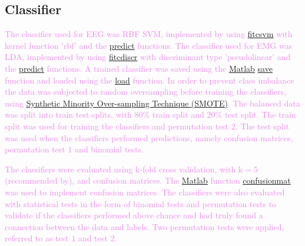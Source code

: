 
\subsection{Classifier}
\textcolor{violet}{The classifier used for EEG was RBF SVM, implemented by using \href{https://se.mathworks.com/help/stats/fitcsvm.html}{fitcsvm} with kernel function 'rbf' and the \href{https://se.mathworks.com/help/stats/linearmodel.predict.html}{predict} functions.}
\textcolor{violet}{The classifier used for EMG was LDA, implemented by using \href{https://se.mathworks.com/help/stats/fitcdiscr.html}{fitcdiscr} with discriminant type 'pseudolinear' and the \href{https://se.mathworks.com/help/stats/linearmodel.predict.html}{predict} functions.}
\textcolor{violet}{A trained classifier was saved using the \href{https://se.mathworks.com/products/matlab.html}{Matlab} \href{https://se.mathworks.com/help/matlab/ref/save.html}{save} function and loaded using the \href{https://se.mathworks.com/help/matlab/ref/load.html}{load} function.}
\textcolor{violet}{In order to prevent class imbalance the data was subjected to random oversampling before training the classifiers, using \href{https://se.mathworks.com/matlabcentral/fileexchange/75401-synthetic-minority-over-sampling-technique-smote}{Synthetic Minority Over-sampling Technique (SMOTE)}.}
\textcolor{violet}{The balanced data was split into train test splits, with $80\%$ train split and $20\%$ test split. The train split was used for training the classifiers and permutation test $2$. The test split was used when the classifiers performed predictions, namely confusion matrices, permutation test $1$ and binomial tests.}

\textcolor{violet}{The classifiers were evaluated using k-fold cross validation, with $\text{k} = 5$ (recommended by\:\cite{noirhommeBiasedBinomialAssessment2014}\cite{varoquauxAssessingTuningBrain2017}), and confusion matrices. The \href{https://se.mathworks.com/products/matlab.html}{Matlab} function \href{https://se.mathworks.com/help/stats/confusionmat.html}{confusionmat} was used to implement confusion matrices.}
\textcolor{violet}{The classifiers were also evaluated with statistical tests in the form of binomial tests and permutation tests to validate if the classifiers performed above chance and had truly found a connection between the data and labels. Two permutation tests were applied, referred to as test $1$ and test $2$.}

